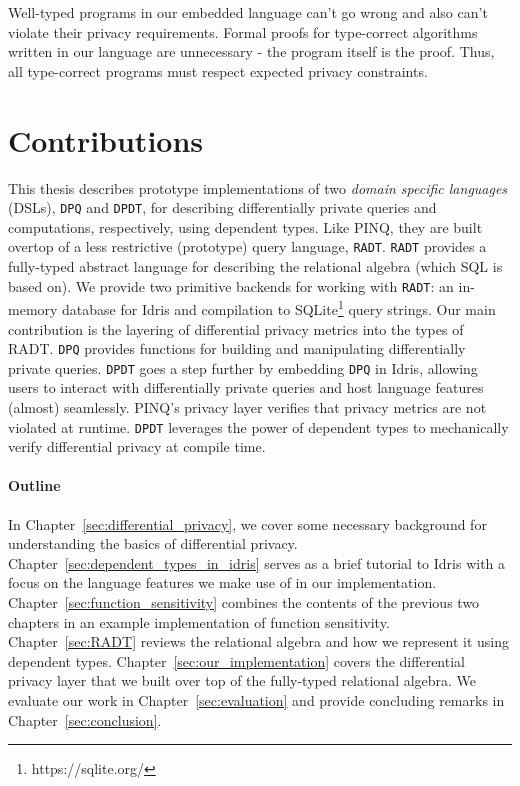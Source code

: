 \documentclass[12pt]{report}
\begin{document}
Well-typed programs in our embedded language can't go wrong and also can't violate their privacy requirements.
Formal proofs for type-correct algorithms written in our language are unnecessary - the program itself is the proof.
Thus, all type-correct programs must respect expected privacy constraints.

\section{Contributions}

This thesis describes prototype implementations of two \textit{domain specific languages} (DSLs), \texttt{DPQ} and \texttt{DPDT}, for describing differentially private queries and computations, respectively, using dependent types.
Like PINQ, they are built overtop of a less restrictive (prototype) query language, \texttt{RADT}.
\texttt{RADT} provides a fully-typed abstract language for describing the relational algebra (which SQL is based on).
We provide two primitive backends for working with \texttt{RADT}: an in-memory database for Idris and compilation to SQLite\footnote{https://sqlite.org/} query strings.
Our main contribution is the layering of differential privacy metrics into the types of RADT.
\texttt{DPQ} provides functions for building and manipulating differentially private queries.
\texttt{DPDT} goes a step further by embedding \texttt{DPQ} in Idris, allowing users to interact with differentially private queries and host language features (almost) seamlessly.
PINQ's privacy layer verifies that privacy metrics are not violated at runtime.
\texttt{DPDT} leverages the power of dependent types to mechanically verify differential privacy at compile time.

\paragraph{Outline}


In Chapter~\ref{sec:differential_privacy}, we cover some necessary background for understanding the basics of differential privacy.
Chapter~\ref{sec:dependent_types_in_idris} serves as a brief tutorial to Idris with a focus on the language features we make use of in our implementation.
Chapter~\ref{sec:function_sensitivity} combines the contents of the previous two chapters in an example implementation of function sensitivity.
Chapter~\ref{sec:RADT} reviews the relational algebra and how we represent it using dependent types.
Chapter~\ref{sec:our_implementation} covers the differential privacy layer that we built over top of the fully-typed relational algebra.
We evaluate our work in Chapter~\ref{sec:evaluation} and provide concluding remarks in Chapter~\ref{sec:conclusion}.
\end{document}

